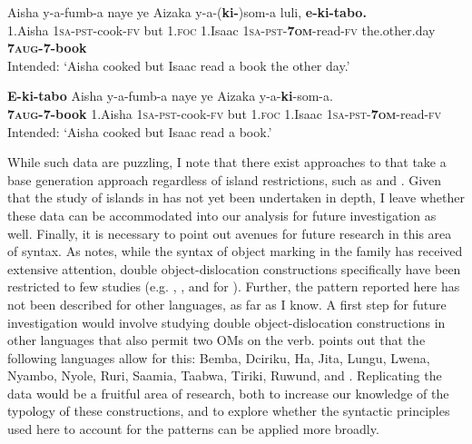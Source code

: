 \documentclass[output=paper,newtxmath,modfonts,nonflat,hidelinks]{langsci/langscibook}
\begin{document}
\ea\label{ex:ranero:43}
\gll *Aisha  y-a-fumb-a          naye ye      Aizaka  y-a-(\textbf{ki-})som-a            luli,              \textbf{e-ki-tabo.} \\
1.Aisha \textsc{1sa-pst}{}-cook-\textsc{fv} but   1.\textsc{foc} 1.Isaac  \textsc{1sa-pst}{}-\textbf{\textsc{7om}}{}-read-\textsc{fv} the.other.day \textbf{7\textsc{aug}}\textbf{{}-7-book}\\
\glt Intended: ‘Aisha cooked but Isaac read a book the other day.’
\z

\ea\label{ex:ranero:44}
\gll *\textbf{E-ki-tabo}     Aisha    y-a-fumb-a   naye ye       Aizaka y-a-\textbf{ki}{}-som-a.\\
\textbf{7\textsc{aug}}\textbf{{}-7-book} 1.Aisha \textsc{1sa-pst}{}-cook\textsc{{}-fv} but   1.\textsc{foc} 1.Isaac \textsc{1sa-pst}{}-\textbf{7\textsc{om}}{}-read-\textsc{fv}\\
\glt Intended: ‘Aisha cooked but Isaac read a book.’
\z

{While such data are puzzling, I note that there exist approaches to \linebreak {} that take a base generation approach regardless of island restrictions, such as \citet{Cinque1990} and \citet{iatridou1995}. Given that the study of islands in  has not yet been undertaken in depth, I leave whether these data can be accommodated into our analysis for future investigation as well. Finally, it is necessary to point out avenues for future research in this area of  syntax. As \citet{Zeller2015} notes, while the syntax of object marking in the family has received extensive attention, double object-dislocation constructions specifically have been restricted to few studies (e.g. \citealt{Adams2010}, \citealt{zeller2009}, and \citealt{Zeller2015} for ). Further, the pattern reported here has not been described for other  languages, as far as I know. A first step for future investigation would involve studying double object-dislocation constructions in other  languages that also permit two OMs on the verb. \citet{Marlo2015} points out that the following languages allow for this: Bemba, Dciriku, Ha, Jita, Lungu, Lwena, Nyambo, Nyole, Ruri, Saamia, Taabwa, Tiriki, Ruwund, and . Replicating the  data would be a fruitful area of research, both to increase our knowledge of the typology of these constructions, and to explore whether the syntactic principles used here to account for the  patterns can be applied more broadly.}
\end{document}

